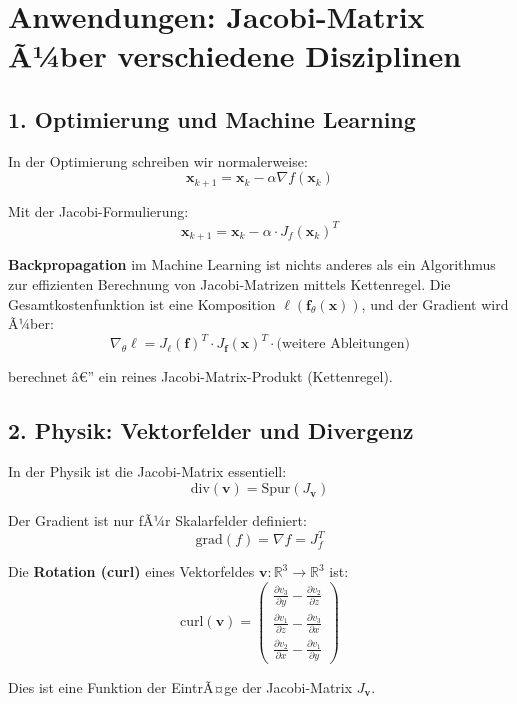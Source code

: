 ﻿\documentclass[a4paper,12pt]{article}
\theoremstyle{definition}
\begin{document}
\section{Anwendungen: Jacobi-Matrix Ã¼ber verschiedene Disziplinen}

\subsection{1. Optimierung und Machine Learning}

In der Optimierung schreiben wir normalerweise:
\[
\boldsymbol{x}_{k+1} = \boldsymbol{x}_k - \alpha \nabla f(\boldsymbol{x}_k)
\]

Mit der Jacobi-Formulierung:
\[
\boldsymbol{x}_{k+1} = \boldsymbol{x}_k - \alpha \cdot J_f(\boldsymbol{x}_k)^T
\]

\textbf{Backpropagation} im Machine Learning ist nichts anderes als ein Algorithmus zur effizienten Berechnung von Jacobi-Matrizen mittels Kettenregel. Die Gesamtkostenfunktion ist eine Komposition $\ell(\boldsymbol{f}_{\theta}(\boldsymbol{x}))$, und der Gradient wird Ã¼ber:
\[
\nabla_{\theta} \ell = J_{\ell}(\boldsymbol{f})^T \cdot J_{\boldsymbol{f}}(\boldsymbol{x})^T \cdot \text{(weitere Ableitungen)}
\]

berechnet â€” ein reines Jacobi-Matrix-Produkt (Kettenregel).

\subsection{2. Physik: Vektorfelder und Divergenz}

In der Physik ist die Jacobi-Matrix essentiell:
\[
\text{div}(\boldsymbol{v}) = \text{Spur}(J_{\boldsymbol{v}})
\]

Der Gradient ist nur fÃ¼r Skalarfelder definiert:
\[
\text{grad}(f) = \nabla f = J_f^T
\]

Die \textbf{Rotation (curl)} eines Vektorfeldes $\boldsymbol{v}: \mathbb{R}^3 \to \mathbb{R}^3$ ist:
\[
\text{curl}(\boldsymbol{v}) = \begin{pmatrix} 
	\frac{\partial v_3}{\partial y} - \frac{\partial v_2}{\partial z} \\
	\frac{\partial v_1}{\partial z} - \frac{\partial v_3}{\partial x} \\
	\frac{\partial v_2}{\partial x} - \frac{\partial v_1}{\partial y}
\end{pmatrix}
\]

Dies ist eine Funktion der EintrÃ¤ge der Jacobi-Matrix $J_{\boldsymbol{v}}$.
\end{document}

